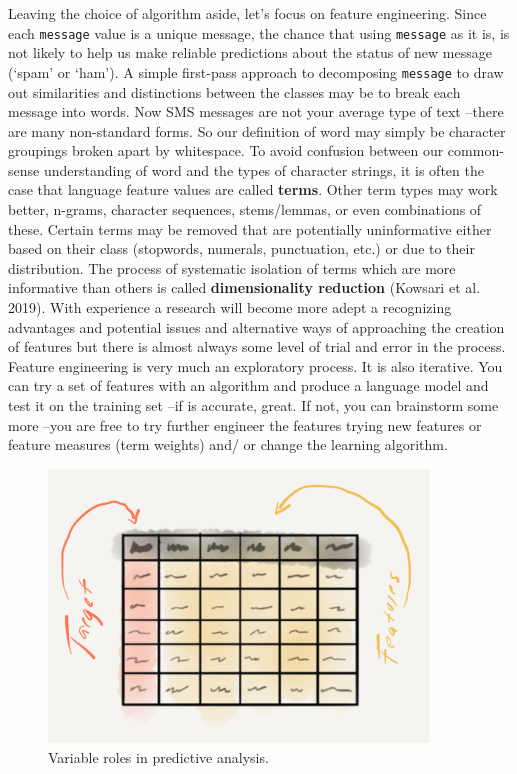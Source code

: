 \documentclass[
  letterpaper,
]{latex/krantz}
\begin{document}
Leaving the choice of algorithm aside, let's focus on feature
engineering. Since each \texttt{message} value is a unique message, the
chance that using \texttt{message} as it is, is not likely to help us
make reliable predictions about the status of new message (`spam' or
`ham'). A simple first-pass approach to decomposing \texttt{message} to
draw out similarities and distinctions between the classes may be to
break each message into words. Now SMS messages are not your average
type of text --there are many non-standard forms. So our definition of
word may simply be character groupings broken apart by whitespace. To
avoid confusion between our common-sense understanding of word and the
types of character strings, it is often the case that language feature
values are called \textbf{terms}. Other term types may work better,
n-grams, character sequences, stems/lemmas, or even combinations of
these. Certain terms may be removed that are potentially uninformative
either based on their class (stopwords, numerals, punctuation, etc.) or
due to their distribution. The process of systematic isolation of terms
which are more informative than others is called \textbf{dimensionality
reduction} (Kowsari et al. 2019). With experience a research will become
more adept a recognizing advantages and potential issues and alternative
ways of approaching the creation of features but there is almost always
some level of trial and error in the process. Feature engineering is
very much an exploratory process. It is also iterative. You can try a
set of features with an algorithm and produce a language model and test
it on the training set --if is accurate, great. If not, you can
brainstorm some more --you are free to try further engineer the features
trying new features or feature measures (term weights) and/ or change
the learning algorithm.

\begin{figure}

{\centering \includegraphics[width=0.9\textwidth,height=\textheight]{./figures/approaching-analysis/predictive-variables.png}

}

\caption{\label{fig-aa-predictive-variables}Variable roles in predictive
analysis.}

\end{figure}
\end{document}
